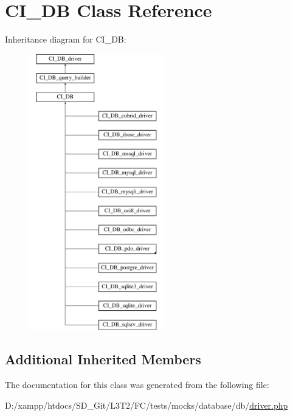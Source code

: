 \hypertarget{class_c_i___d_b}{}\section{C\+I\+\_\+\+D\+B Class Reference}
\label{class_c_i___d_b}
Inheritance diagram for C\+I\+\_\+\+D\+B\+:\begin{figure}[H]
\begin{center}
\leavevmode
\includegraphics[height=12.000000cm]{class_c_i___d_b}
\end{center}
\end{figure}
\subsection*{Additional Inherited Members}


The documentation for this class was generated from the following file\+:\begin{DoxyCompactItemize}
\item 
D\+:/xampp/htdocs/\+S\+D\+\_\+\+Git/\+L3\+T2/\+F\+C/tests/mocks/database/db/\hyperlink{tests_2mocks_2database_2db_2_driver_8php}{driver.\+php}\end{DoxyCompactItemize}
